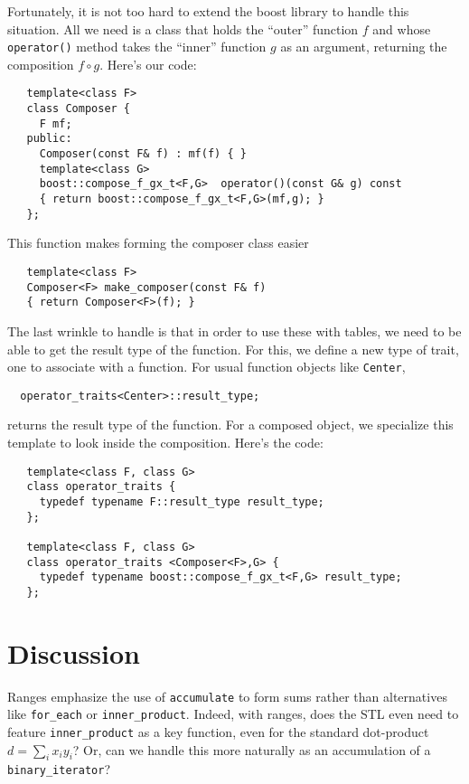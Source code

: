 \documentclass[12pt]{article}
\begin{document}
Fortunately, it is not too hard to extend the boost library to handle
this situation. All we need is a class that holds the ``outer''
function $f$ and whose {\tt operator()} method takes the ``inner''
function $g$ as an argument, returning the composition $f\circ g$.
Here's our code:
\begin{verbatim}
   template<class F>
   class Composer {
     F mf;
   public:
     Composer(const F& f) : mf(f) { }
     template<class G>
     boost::compose_f_gx_t<F,G>  operator()(const G& g) const
     { return boost::compose_f_gx_t<F,G>(mf,g); }
   };
\end{verbatim}
This function makes forming the composer class easier
\begin{verbatim}
   template<class F>
   Composer<F> make_composer(const F& f) 
   { return Composer<F>(f); }
\end{verbatim}
The last wrinkle to handle is that in order to use these with tables,
we need to be able to get the result type of the function.  For this,
we define a new type of trait, one to associate with  a function.  For
usual function objects like {\tt Center}, 
\begin{verbatim}
  operator_traits<Center>::result_type;
\end{verbatim}
returns the result type of the function.  For a composed object, we
specialize this template to look inside the composition.  Here's the
code:
\begin{verbatim}
   template<class F, class G>
   class operator_traits {
     typedef typename F::result_type result_type;
   };

   template<class F, class G>
   class operator_traits <Composer<F>,G> {
     typedef typename boost::compose_f_gx_t<F,G> result_type;
   };
\end{verbatim}


\section{Discussion}

  Ranges emphasize the use of {\tt accumulate} to form sums rather than
alternatives like {\tt for\_each} or {\tt inner\_product}. Indeed,
with ranges, does the STL even need to feature {\tt inner\_product} as
a key function, even for the standard dot-product $d = \sum_i x_i
y_i$?  Or, can we handle this more naturally as an accumulation of a
{\tt binary\_iterator}?  
\end{document}
